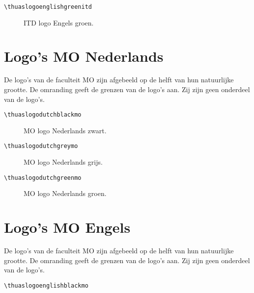 \documentclass[a4paper,12pt]{article}
\begin{document}
\begin{verbatim}
\thuaslogoenglishgreenitd
\end{verbatim}

\begin{figure}[H]
\centering\fboxsep=0pt%
\fbox{%
\scalebox{0.7071}{\thuaslogoenglishgreenitd}}
\caption{ITD logo Engels groen.}
\end{figure}


\section{Logo's MO Nederlands}
De logo's van de faculteit MO zijn afgebeeld op de helft van hun natuurlijke grootte.
De omranding geeft de grenzen van de logo's aan. Zij zijn geen onderdeel
van de logo's.

\begin{verbatim}
\thuaslogodutchblackmo
\end{verbatim}

\begin{figure}[H]
\centering\fboxsep=0pt%
\fbox{%
\scalebox{0.7071}{\thuaslogodutchblackmo}}
\caption{MO logo Nederlands zwart.}
\end{figure}

\begin{verbatim}
\thuaslogodutchgreymo
\end{verbatim}

\begin{figure}[H]
\centering\fboxsep=0pt%
\fbox{%
\scalebox{0.7071}{\thuaslogodutchgreymo}}
\caption{MO logo Nederlands grijs.}
\end{figure}

\begin{verbatim}
\thuaslogodutchgreenmo
\end{verbatim}

\begin{figure}[H]
\centering\fboxsep=0pt%
\fbox{%
\scalebox{0.7071}{\thuaslogodutchgreenmo}}
\caption{MO logo Nederlands groen.}
\end{figure}


\section{Logo's MO Engels}
De logo's van de faculteit MO zijn afgebeeld op de helft van hun natuurlijke grootte.
De omranding geeft de grenzen van de logo's aan. Zij zijn geen onderdeel
van de logo's.

\begin{verbatim}
\thuaslogoenglishblackmo
\end{verbatim}
\end{document}
